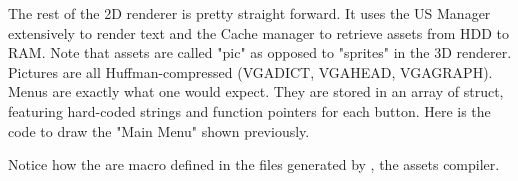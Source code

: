 \par
The rest of the 2D renderer is pretty straight forward. It uses the US Manager extensively to render text and the Cache manager to retrieve assets from HDD to RAM. Note that assets are called "pic" as opposed to "sprites" in the 3D renderer. Pictures are all Huffman-compressed (VGADICT, VGAHEAD, VGAGRAPH). Menus are exactly what one would expect. They are stored in an array of struct, featuring hard-coded strings and function pointers for each button. Here is the code to draw the "Main Menu" shown previously.\\

\par
\begin{minipage}{\textwidth}

\end{minipage}

\par
\begin{minipage}{\textwidth}

\end{minipage}
\par
Notice how the  are macro defined in the files generated by , the assets compiler.

